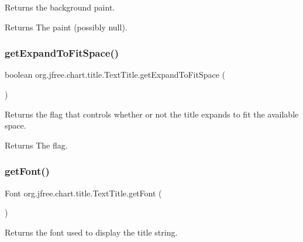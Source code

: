 Returns the background paint.

\begin{DoxyReturn}{Returns}
The paint (possibly {\ttfamily null}). 
\end{DoxyReturn}
\mbox{\label{classorg_1_1jfree_1_1chart_1_1title_1_1_text_title_a709a7c488b39c77cc46c6257f68b44f4}} 
\subsubsection{\texorpdfstring{get\+Expand\+To\+Fit\+Space()}{getExpandToFitSpace()}}
{\footnotesize\ttfamily boolean org.\+jfree.\+chart.\+title.\+Text\+Title.\+get\+Expand\+To\+Fit\+Space (\begin{DoxyParamCaption}{ }\end{DoxyParamCaption})}

Returns the flag that controls whether or not the title expands to fit the available space.

\begin{DoxyReturn}{Returns}
The flag. 
\end{DoxyReturn}
\mbox{\label{classorg_1_1jfree_1_1chart_1_1title_1_1_text_title_aee9adcb15d6cadf5ec0282cdf5225f53}} 
\subsubsection{\texorpdfstring{get\+Font()}{getFont()}}
{\footnotesize\ttfamily Font org.\+jfree.\+chart.\+title.\+Text\+Title.\+get\+Font (\begin{DoxyParamCaption}{ }\end{DoxyParamCaption})}

Returns the font used to display the title string.

